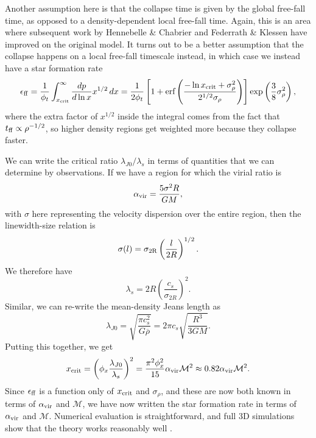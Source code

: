 Another assumption here is that the collapse time is given by the global free-fall time, as opposed to a density-dependent local free-fall time. Again, this is an area where subsequent work by Hennebelle \& Chabrier and Federrath \& Klessen have improved on the original model. It turns out to be a better assumption that the collapse happens on a local free-fall timescale instead, in which case we instead have a star formation rate
\begin{equation}
\epsilon_{\rm ff} = \frac{1}{\phi_t} \int_{x_{\rm crit}}^\infty \frac{dp}{d\ln x} x^{1/2} \, dx
= \frac{1}{2\phi_t} \left[1+\mbox{erf}\left(\frac{-\ln x_{\rm crit}+\sigma_{\rho}^2}{2^{1/2}\sigma_{\rho}}\right)\right] \exp\left(\frac{3}{8}\sigma_\rho^2\right),
\end{equation}
where the extra factor of $x^{1/2}$ inside the integral comes from the fact that $t_{\rm ff} \propto \rho^{-1/2}$, so higher density regions get weighted more because they collapse faster.

We can write the critical ratio $\lambda_{J0}/\lambda_s$ in terms of quantities that we can determine by observations. If we have a region for which the virial ratio is
\begin{equation}
\alpha_{\mathrm{vir}} = \frac{5\sigma^2 R}{GM},
\end{equation}
with $\sigma$ here representing the velocity dispersion over the entire region, then the linewidth-size relation is
\begin{equation}
\sigma(l) = \sigma_{\rm 2R} \left(\frac{l}{2R}\right)^{1/2}.
\end{equation}
We therefore have
\begin{equation}
\lambda_s = 2R \left(\frac{c_s}{\sigma_{2R}}\right)^2.
\end{equation}
Similar, we can re-write the mean-density Jeans length as
\begin{equation}
\lambda_{J0} = \sqrt{\frac{\pi c_s^2}{G\overline{\rho}}} = 2\pi c_s \sqrt{\frac{R^3}{3 GM}}.
\end{equation}
Putting this together, we get
\begin{equation}
x_{\rm crit} = \left(\phi_x \frac{\lambda_{J0}}{\lambda_s}\right)^2 = \frac{\pi^2 \phi_x^2}{15} \alpha_{\mathrm{vir}} \mathcal{M}^2 \approx 0.82\alpha_{\mathrm{vir}} \mathcal{M}^2.
\end{equation}
Since $\epsilon_{\rm ff}$ is a function only of $x_{\rm crit}$ and $\sigma_{\rho}$, and these are now both known in terms of $\alpha_{\mathrm{vir}}$ and $\mathcal{M}$, we have now written the star formation rate in terms of $\alpha_{\mathrm{vir}}$ and $\mathcal{M}$. Numerical evaluation is straightforward, and full 3D simulations show that the theory works reasonably well \citep{federrath12a}. 

